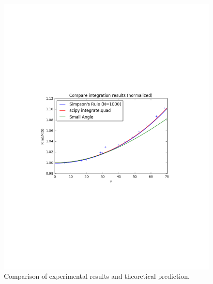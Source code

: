 \documentclass[journal, a4paper]{IEEEtran}
\begin{document}
	\begin{figure}[!hbt]
		\begin{center}
		\includegraphics[width=\columnwidth]{pendulum.pdf}
		\caption{Comparison of experimental results and theoretical prediction.}
		\label{fig:tf_plot}
		\end{center}
	\end{figure}

\printbibliography[title={References}]

\end{document}
